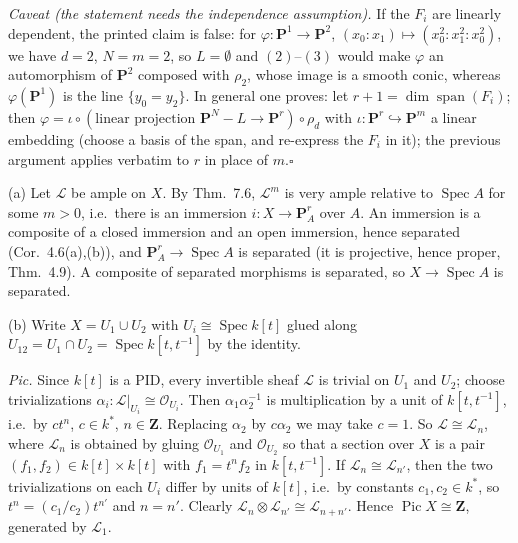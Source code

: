 \documentclass[11pt]{article}
\begin{document}
\emph{Caveat (the statement needs the independence assumption).} If the $F_i$ are linearly dependent, the printed claim is false: for $\varphi:\mathbf P^1\to\mathbf P^2$, $(x_0:x_1)\mapsto(x_0^2:x_1^2:x_0^2)$, we have $d=2$, $N=m=2$, so $L=\emptyset$ and $(2)$--$(3)$ would make $\varphi$ an automorphism of $\mathbf P^2$ composed with $\rho_2$, whose image is a smooth conic, whereas $\varphi(\mathbf P^1)$ is the line $\{y_0=y_2\}$. In general one proves: let $r+1=\dim\operatorname{span}(F_i)$; then $\varphi=\iota\circ(\text{linear projection }\mathbf P^N-L\to\mathbf P^r)\circ\rho_d$ with $\iota:\mathbf P^r\hookrightarrow\mathbf P^m$ a linear embedding (choose a basis of the span, and re-express the $F_i$ in it); the previous argument applies verbatim to $r$ in place of $m$.\hfill$\square$

\pf
(a) Let $\mathcal L$ be ample on $X$. By Thm.~7.6, $\mathcal L^m$ is very ample relative to $\operatorname{Spec}A$ for some $m>0$, i.e.\ there is an immersion $i:X\to\mathbf P^r_A$ over $A$. An immersion is a composite of a closed immersion and an open immersion, hence separated (Cor.~4.6(a),(b)), and $\mathbf P^r_A\to\operatorname{Spec}A$ is separated (it is projective, hence proper, Thm.~4.9). A composite of separated morphisms is separated, so $X\to\operatorname{Spec}A$ is separated.

(b) Write $X=U_1\cup U_2$ with $U_i\cong\operatorname{Spec}k[t]$ glued along $U_{12}=U_1\cap U_2=\operatorname{Spec}k[t,t^{-1}]$ by the identity.

\emph{Pic.} Since $k[t]$ is a PID, every invertible sheaf $\mathcal L$ is trivial on $U_1$ and $U_2$; choose trivializations $\alpha_i:\mathcal L|_{U_i}\cong\mathcal O_{U_i}$. Then $\alpha_1\alpha_2^{-1}$ is multiplication by a unit of $k[t,t^{-1}]$, i.e.\ by $ct^n$, $c\in k^*$, $n\in\mathbf Z$. Replacing $\alpha_2$ by $c\alpha_2$ we may take $c=1$. So $\mathcal L\cong\mathcal L_n$, where $\mathcal L_n$ is obtained by gluing $\mathcal O_{U_1}$ and $\mathcal O_{U_2}$ so that a section over $X$ is a pair $(f_1,f_2)\in k[t]\times k[t]$ with $f_1=t^nf_2$ in $k[t,t^{-1}]$. If $\mathcal L_n\cong\mathcal L_{n'}$, then the two trivializations on each $U_i$ differ by units of $k[t]$, i.e.\ by constants $c_1,c_2\in k^*$, so $t^n=(c_1/c_2)t^{n'}$ and $n=n'$. Clearly $\mathcal L_n\otimes\mathcal L_{n'}\cong\mathcal L_{n+n'}$. Hence $\operatorname{Pic}X\cong\mathbf Z$, generated by $\mathcal L_1$.
\end{document}
